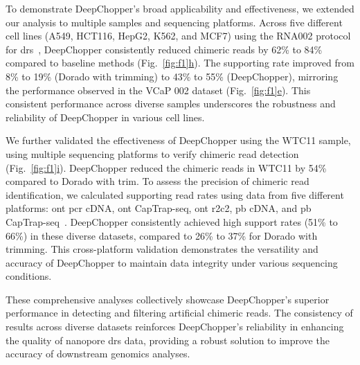 \documentclass[pdflatex, sn-mathphys-num, lineno]{sn-jnl}%
\newcommand{\figref}[2]{Fig.~\hyperref[#1]{\ref*{#1}#2}}
\theoremstyle{thmstyleone}%
\theoremstyle{thmstyletwo}%
\theoremstyle{thmstylethree}%
\begin{document}
To demonstrate DeepChopper's broad applicability and effectiveness, we extended our analysis to multiple samples and sequencing platforms.
Across five different cell lines (A549, HCT116, HepG2, K562, and MCF7) using the RNA002 protocol for \gls{drs}~\cite{chen2021systematic}, DeepChopper consistently reduced chimeric reads by 62\% to 84\% compared to baseline methods (\figref{fig:f1}{h}).
The supporting rate improved from 8\% to 19\% (Dorado with trimming) to 43\% to 55\% (DeepChopper), mirroring the performance observed in the VCaP 002 dataset (\figref{fig:f1}{e}).
This consistent performance across diverse samples underscores the robustness and reliability of DeepChopper in various cell lines.

We further validated the effectiveness of DeepChopper using the WTC11 sample, using multiple sequencing platforms to verify chimeric read detection (\figref{fig:f1}{i}).
DeepChopper reduced the chimeric reads in WTC11 by 54\% compared to Dorado with trim.
To assess the precision of chimeric read identification, we calculated supporting read rates using data from five different platforms: \gls{ont} \gls{pcr} cDNA, \gls{ont} CapTrap-seq, \gls{ont} \gls{r2c2}, \gls{pb} cDNA, and \gls{pb} CapTrap-seq~\cite{carbonell2024captrap}.
DeepChopper consistently achieved high support rates (51\% to 66\%) in these diverse datasets, compared to 26\% to 37\% for Dorado with trimming.
This cross-platform validation demonstrates the versatility and accuracy of DeepChopper to maintain data integrity under various sequencing conditions.

These comprehensive analyses collectively showcase DeepChopper's superior performance in detecting and filtering artificial chimeric reads.
The consistency of results across diverse datasets reinforces DeepChopper's reliability in enhancing the quality of nanopore \gls{drs} data, providing a robust solution to improve the accuracy of downstream genomics analyses.
\end{document}
